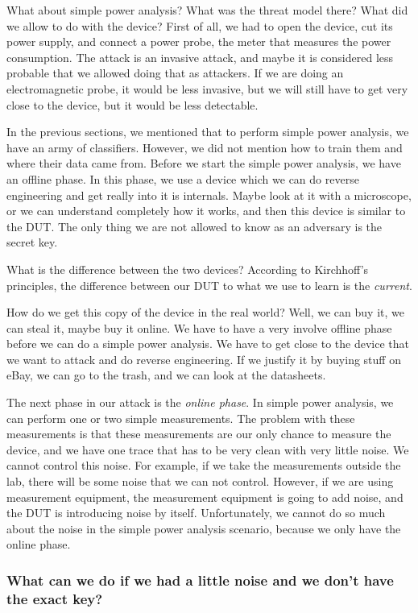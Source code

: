 What about simple power analysis? 
What was the threat model there? 
What did we allow to do with the device? 
First of all, we had to open the device, cut its power supply, and connect a power probe, the meter that measures the power consumption.
The attack is an invasive attack, and maybe it is considered less probable that we allowed doing that as attackers. 
If we are doing an electromagnetic probe, it would be less invasive, but we will still have to get very close to the device, but it would be less detectable. 

In the previous sections, we mentioned that to perform simple power analysis, we have an army of classifiers.
However, we did not mention how to train them and where their data came from.
Before we start the simple power analysis, we have an offline phase.
In this phase, we use a device which we can do reverse engineering and get really into it is internals. 
Maybe look at it with a microscope, or we can understand completely how it works, and then this device is similar to the DUT. 
The only thing we are not allowed to know as an adversary is the secret key.

What is the difference between the two devices? 
According to Kirchhoff's principles, the difference between our DUT to what we use to learn is the \textit{current}. 
  
How do we get this copy of the device in the real world?
Well, we can buy it, we can steal it, maybe buy it online. 
We have to have a very involve offline phase before we can do a simple power analysis.
We have to get close to the device that we want to attack and do reverse engineering.
If we justify it by buying stuff on eBay, we can go to the trash, and we can look at the datasheets.

The next phase in our attack is the \textit{online phase}. 
In simple power analysis, we can perform one or two simple measurements.
The problem with these measurements is that these measurements are our only chance to measure the device, and we have one trace that has to be very clean with very little noise. 
We cannot control this noise.
For example, if we take the measurements outside the lab, there will be some noise that we can not control. 
However, if we are using measurement equipment, the measurement equipment is going to add noise, and the DUT is introducing noise by itself.
Unfortunately, we cannot do so much about the noise in the simple power analysis scenario, because we only have the online phase.

\subsubsection{What can we do if we had a little noise and we don't have the exact key?}

